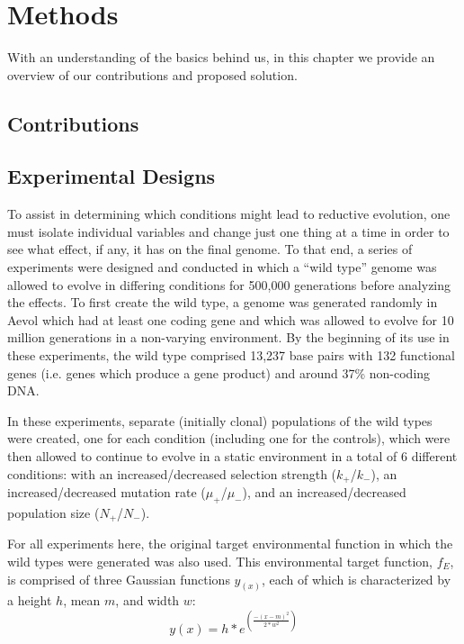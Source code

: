 \chapter{Methods}\label{ch:methods}
With an understanding of the basics behind us, in this chapter we provide an overview of our contributions and proposed solution.
\section{Contributions}

\section{Experimental Designs} \label{experimental_design}
To assist in determining which conditions might lead to reductive evolution, one must isolate individual variables and change just one thing at a time in order to see what effect, if any, it has on the final genome. To that end, a series of experiments were designed and conducted in which a ``wild type'' genome was allowed to evolve in differing conditions for 500,000 generations before analyzing the effects. To first create the wild type, a genome was generated randomly in Aevol which had at least one coding gene and which was allowed to evolve for 10 million generations in a non-varying environment. By the beginning of its use in these experiments, the wild type comprised 13,237 base pairs with 132 functional genes (i.e. genes which produce a gene product) and around 37\% non-coding DNA. 

In these experiments, separate (initially clonal) populations of the wild types were created, one for each condition (including one for the controls), which were then allowed to continue to evolve in a static environment in a total of 6 different conditions: with an increased/decreased selection strength ($k_+$/$k_-$), an increased/decreased mutation rate ($\mu_+$/$\mu_-$), and an increased/decreased population size ($N_+$/$N_-$). 

For all experiments here, the original target environmental function in which the wild types were generated was also used. This environmental target function, $f_E$, is comprised of three Gaussian functions $y_(x)$, each of which is characterized by a height $h$, mean $m$, and width $w$:
\begin{equation*}
y(x) = h * e^{\left(\frac{-(x-m)^2}{2 * w^2} \right)}
\end{equation*}

